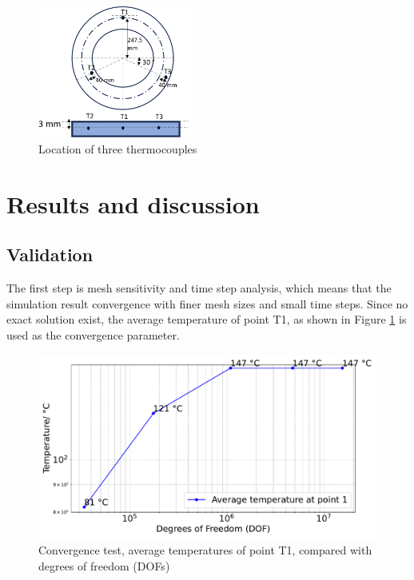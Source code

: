 \begin{figure}[h]
    \centering
    \includegraphics[width=0.45\textwidth]{book/chapters/zhang/graphics/thermo_couples.png}
    \caption{Location of three thermocouples}
    \label{fig:thermocouples}
\end{figure}


\section*{Results and discussion}

\subsection*{Validation}
The first step is mesh sensitivity and time step analysis, which means that the simulation result convergence with finer mesh sizes and small time steps. Since no exact solution exist, the average temperature of point T1, as shown in Figure \ref{fig:thermocouples} is used as the convergence parameter.
\begin{figure}
    \centering
    \includegraphics[width=0.8\linewidth]{book/chapters/zhang/graphics/ave_T_vs_dof.pdf}
    \caption{Convergence test, average temperatures of point T1, compared with degrees of freedom (DOFs)}
    \label{fig:error_mesh}
\end{figure}

